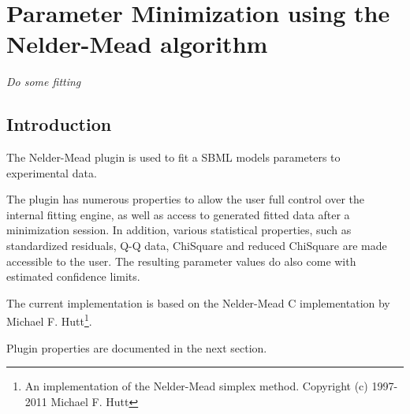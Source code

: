 \chapter*{Parameter Minimization using the Nelder-Mead algorithm}
\setcounter{chapter}{1}
\emph{Do some fitting}
\section{Introduction}
The Nelder-Mead plugin is used to fit a SBML models parameters to experimental data. 

The plugin has numerous properties to allow the user full control over the internal fitting engine, as well as 
access to generated fitted data after a minimization session. In addition, various statistical properties, such as standardized residuals, Q-Q data, ChiSquare and reduced ChiSquare are made accessible to the user. The resulting parameter values do also come with estimated confidence limits.

The current implementation is based on the Nelder-Mead C implementation by Michael F. Hutt\footnote{ 

 An implementation of the Nelder-Mead simplex method. 
 Copyright (c) 1997-2011 Michael F. Hutt
}.


Plugin properties are documented in the next section.

